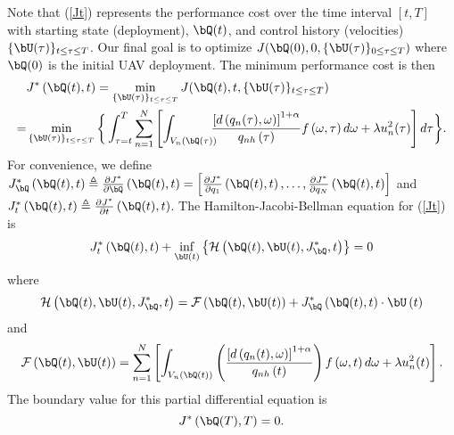 Note that (\ref{Jt}) represents the performance cost over the time interval $[t,T]$ with starting state (deployment), $\bQ(t)$, and control history (velocities) $\{\bU(\tau)\}_{t\le\tau\le T}$.
Our final goal is to optimize $J\!\left(\bQ(0), 0, \{\bU(\tau)\}_{0\le\tau\le T}\right)$ where $\bQ(0)$ is the initial UAV deployment.
The minimum performance cost is then
\begin{equation}
\begin{aligned}
&J^*\left(\bQ(t), t\right) = \min_{\{\bU(\tau)\}_{t\le\tau\le T}}J\!\left(\bQ(t), t, \{\bU(\tau)\}_{t\le\tau\le T}\right)\\
{=}& \min_{\{\bU(\tau)\}_{t\le\tau\le T}}\bigg\{\int_{\tau=t}^{T}\sum_{n=1}^{N}\left[\int_{V_n\left(\bQ(\tau)\right)}\!\!\!\!\frac{\left[d\left(q_n(\tau),\omega\right)\right]^{1+\alpha}}{q_{nh}\left(\tau\right)}f\left(\omega,\tau\right)d\omega + \lambda u^2_n(\tau) \right] d\tau\bigg\}.
\end{aligned}
\end{equation}
For convenience, we define $J^*_{\bQ}\left(\bQ(t), t\right)\triangleq\frac{\partial J^*}{\partial \bQ}\left(\bQ(t), t\right)=\left[\frac{\partial J^*}{\partial q_1}\left(\bQ(t), t\right),\dots,\frac{\partial J^*}{\partial q_N}\left(\bQ(t), t\right)\right]$ and $J^*_{t}\left(\bQ(t), t\right)\triangleq\frac{\partial J^*}{\partial t}\left(\bQ(t), t\right)$.
The Hamilton-Jacobi-Bellman equation \cite{KD,FRC} for (\ref{Jt}) is
\begin{equation}
J^*_t\left(\bQ(t),t\right)+\inf_{\bU(t)}\left\{\mathcal{H}\left(\bQ(t),\bU(t),J^*_{\bQ},t\right)\right\}=0
\label{HIJ}
\end{equation}
where
\begin{equation}
\mathcal{H}\left(\bQ(t),\bU(t),J^*_{\bQ},t\right)=\mathcal{F}\left(\bQ(t),\bU(t)\right)+J^*_{\bQ}\left(\bQ(t),t\right)\cdot \bU\left(t\right)
\label{mH}
\end{equation}
and
%
\begin{equation}
\mathcal{F}\left(\bQ(t),\bU(t)\right)=\sum_{n=1}^{N}\left[\int_{V_n\left(\bQ(t)\right)}\left(\frac{\left[d\left(q_n(t),\omega\right)\right]^{1+\alpha}}{q_{nh}\left(t\right)}\right)f\left(\omega,t\right)d\omega + \lambda u^2_n(t)\right].
\label{mF}
\end{equation}
The boundary value for this partial differential equation is 
\begin{equation}
J^*\left(\bQ(T),T\right)=0.
\end{equation}
